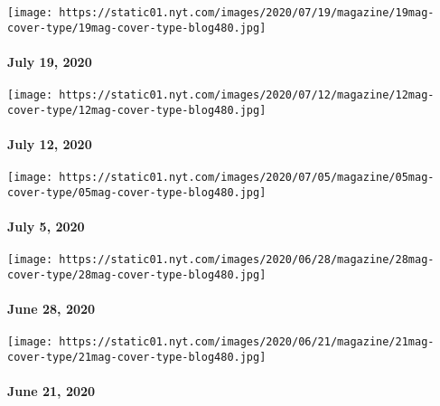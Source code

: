 \texttt{[image: https://static01.nyt.com/images/2020/07/19/magazine/19mag-cover-type/19mag-cover-type-blog480.jpg]}

\hypertarget{july-19-2020}{%
\paragraph{July 19, 2020}\label{july-19-2020}}

\href{https://www.nytimes.com/issue/magazine/2020/07/10/the-71220-issue}{}

\texttt{[image: https://static01.nyt.com/images/2020/07/12/magazine/12mag-cover-type/12mag-cover-type-blog480.jpg]}

\hypertarget{july-12-2020}{%
\paragraph{July 12, 2020}\label{july-12-2020}}

\href{https://www.nytimes.com/issue/magazine/2020/07/02/the-7520-issue}{}

\texttt{[image: https://static01.nyt.com/images/2020/07/05/magazine/05mag-cover-type/05mag-cover-type-blog480.jpg]}

\hypertarget{july-5-2020}{%
\paragraph{July 5, 2020}\label{july-5-2020}}

\href{https://www.nytimes.com/issue/magazine/2020/06/25/the-62820-issue}{}

\texttt{[image: https://static01.nyt.com/images/2020/06/28/magazine/28mag-cover-type/28mag-cover-type-blog480.jpg]}

\hypertarget{june-28-2020}{%
\paragraph{June 28, 2020}\label{june-28-2020}}

\href{https://www.nytimes.com/issue/magazine/2020/06/19/the-62120-issue}{}

\texttt{[image: https://static01.nyt.com/images/2020/06/21/magazine/21mag-cover-type/21mag-cover-type-blog480.jpg]}

\hypertarget{june-21-2020}{%
\paragraph{June 21, 2020}\label{june-21-2020}}

